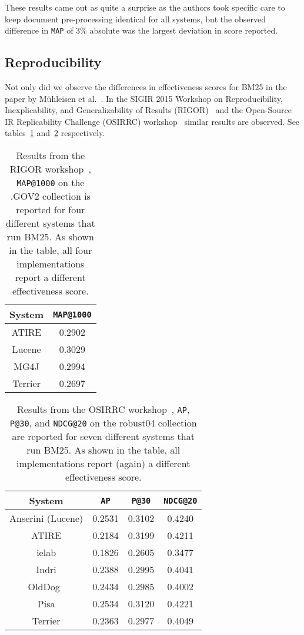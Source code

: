 These results came out as quite a surprise as the authors took specific care to keep document pre-processing identical for all systems, but the observed difference in \texttt{MAP} of 3\% absolute was the largest deviation in score reported.

\subsection{Reproducibility}
Not only did we observe the differences in effectiveness scores for BM25 in the paper by M\"{u}hleisen et al.~\cite{OldDog}. In the SIGIR 2015 Workshop on Reproducibility, Inexplicability, and Generalizability of Results (RIGOR)~\cite{RIGOR} and the Open-Source IR Replicability Challenge (OSIRRC) workshop~\cite{OSIRRC} similar results are observed. See tables~\ref{rigor_results} and~\ref{osirrc_results} respectively.  

\begin{table}
	\centering
	\caption{Results from the RIGOR workshop~\cite{RIGOR}, \texttt{MAP@1000} on the .GOV2 collection is reported for four different systems that run BM25. As shown in the table, all four implementations report a different effectiveness score.}
	\label{rigor_results}
	\begin{tabular}{c c}
		\toprule
		System &  \texttt{MAP@1000} \\
		\midrule
		ATIRE & 0.2902 \\
		Lucene & 0.3029 \\
		MG4J & 0.2994 \\
		Terrier & 0.2697 \\
		\bottomrule
	\end{tabular}
\end{table}

\begin{table}
	\centering
	\caption{Results from the OSIRRC workshop~\cite{OSIRRC}, \texttt{AP}, \texttt{P@30}, and \texttt{NDCG@20} on the robust04 collection are reported for seven different systems that run BM25. As shown in the table, all implementations report (again) a different effectiveness score.}
	\label{osirrc_results}
	\begin{tabular}{c c c c}
		\toprule
		System & \texttt{AP} & \texttt{P@30} & \texttt{NDCG@20} \\
		\midrule
		Anserini (Lucene) & 0.2531 & 0.3102 & 0.4240 \\
		ATIRE & 0.2184 & 0.3199 & 0.4211 \\
		ielab & 0.1826 & 0.2605 & 0.3477 \\
		Indri & 0.2388 & 0.2995 & 0.4041 \\
		OldDog~\cite{olddog-docker} & 0.2434 & 0.2985 & 0.4002 \\
		Pisa & 0.2534 & 0.3120 & 0.4221 \\
		Terrier & 0.2363 & 0.2977 & 0.4049 \\
		\bottomrule
	\end{tabular}
\end{table}

